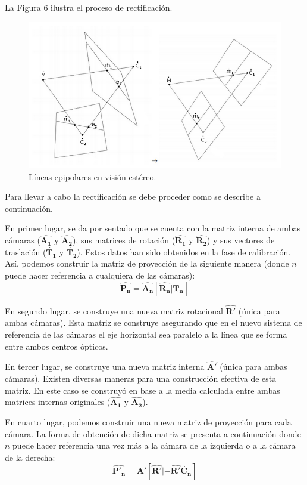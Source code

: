 \documentclass[11pt,a4paper,titlepage]{article}
\newcommand{\Mat}[1]{\ensuremath{\mathbf{\hat{#1}}}}
\newcommand{\ThreeCart}[1]{\ensuremath{\mathbf{\dot{#1}}}}
\newcommand{\Figure}[1]{Figura #1}
\begin{document}
La \Figure{6} ilustra el proceso de rectificación.


\begin{figure}[h!]

  \centering
    \includegraphics[width=1\textwidth]{f6.png}
  \caption{Líneas epipolares en visión estéreo.}
\end{figure}

Para llevar a cabo la rectificación se debe proceder como se describe a continuación.

En primer lugar, se da por sentado que se cuenta con la matriz interna de ambas cámaras (\Mat{A_1} y \Mat{A_2}), sus matrices de rotación (\Mat{R_1} y \Mat{R_2}) y sus vectores de traslación (\ThreeCart{T_1} y \ThreeCart{T_2}). Estos datos han sido obtenidos en la fase de calibración. Así, podemos construir la matriz de proyección de la siguiente manera (donde $n$ puede hacer referencia a cualquiera de las cámaras):
\[
	\Mat{P_n} = \Mat{A_n} \left[ \Mat{R_n} | \ThreeCart{T_n} \right]
\]

En segundo lugar, se construye una nueva matriz rotacional \Mat{R'} (única para ambas cámaras). Esta matriz se construye asegurando que en el nuevo sistema de referencia de las cámaras el eje horizontal sea paralelo a la línea que se forma entre ambos centros ópticos.

En tercer lugar, se construye una nueva matriz interna \Mat{A'} (única para ambas cámaras). Existen diversas maneras para una construcción efectiva de esta matriz. En este caso se construyó en base a la media calculada entre ambas matrices internas originales (\Mat{A_1} y \Mat{A_2}).

En cuarto lugar, podemos construir una nueva matriz de proyección para cada cámara. La forma de obtención de dicha matriz se presenta a continuación donde $n$ puede hacer referencia una vez más a la cámara de la izquierda o a la cámara de la derecha:
\[
	\Mat{P'_n} = \Mat{A'} \left[ \Mat{R'} | -\Mat{R'} \ThreeCart{C_n} \right]
\]
\end{document}
